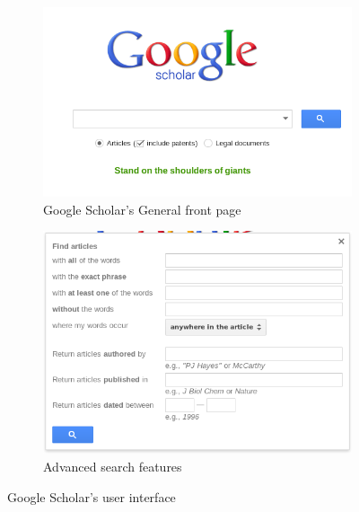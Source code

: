 \begin{figure}[!hbt]
        \centering
        \begin{subfigure}[b]{0.50\textwidth}
                \centering
                \includegraphics[width=\textwidth]{images/googlescholar_front.png}
                \caption{Google Scholar's General front page}
                \label{fig:scholar_basic}
        \end{subfigure}%
        \begin{subfigure}[b]{0.50\textwidth}
                \centering
                \includegraphics[width=\textwidth]{images/googlescholar_advanced.png}
                \caption{Advanced search features}
                \label{fig:scholar_advanced}
        \end{subfigure}

        \caption{Google Scholar's user interface}
        \label{fig:scholar_interface}
\end{figure}

